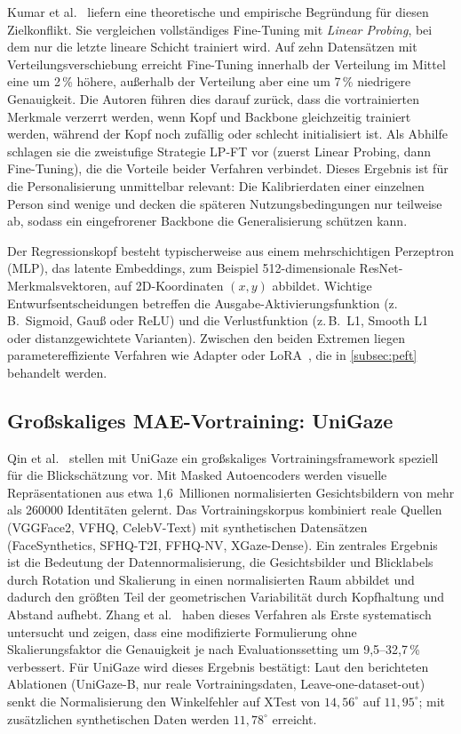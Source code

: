 \documentclass[
  11pt,
  a4paper,
  oneside,
  DIV=12,                 %
  BCOR=8mm,               %
  parskip=half,           %
  headings=normal,
  bibliography=totoc,     %
  listof=totoc            %
]{scrreprt}
\begin{document}
Kumar et al.~\cite{kumar2022finetuning} liefern eine theoretische und empirische Begründung für diesen Zielkonflikt. Sie vergleichen vollständiges Fine-Tuning mit \emph{Linear Probing}, bei dem nur die letzte lineare Schicht trainiert wird. Auf zehn Datensätzen mit Verteilungsverschiebung erreicht Fine-Tuning innerhalb der Verteilung im Mittel eine um 2\,\% höhere, außerhalb der Verteilung aber eine um 7\,\% niedrigere Genauigkeit. Die Autoren führen dies darauf zurück, dass die vortrainierten Merkmale verzerrt werden, wenn Kopf und Backbone gleichzeitig trainiert werden, während der Kopf noch zufällig oder schlecht initialisiert ist. Als Abhilfe schlagen sie die zweistufige Strategie LP-FT vor (zuerst Linear Probing, dann Fine-Tuning), die die Vorteile beider Verfahren verbindet. Dieses Ergebnis ist für die Personalisierung unmittelbar relevant: Die Kalibrierdaten einer einzelnen Person sind wenige und decken die späteren Nutzungsbedingungen nur teilweise ab, sodass ein eingefrorener Backbone die Generalisierung schützen kann.

Der Regressionskopf besteht typischerweise aus einem mehrschichtigen Perzeptron (MLP), das latente Embeddings, zum Beispiel 512-dimensionale ResNet-Merkmalsvektoren, auf 2D-Koordinaten $(x, y)$ abbildet. Wichtige Entwurfsentscheidungen betreffen die Ausgabe-Aktivierungsfunktion (z.\,B.\ Sigmoid, Gauß oder ReLU) und die Verlustfunktion (z.\,B.\ L1, Smooth L1 oder distanzgewichtete Varianten). Zwischen den beiden Extremen liegen parametereffiziente Verfahren wie Adapter oder LoRA~\cite{hu2022lora}, die in \cref{subsec:peft} behandelt werden.

\subsection{Großskaliges MAE-Vortraining: UniGaze}
\label{subsec:unigaze}
Qin et al.~\cite{qin2026unigaze} stellen mit UniGaze ein großskaliges Vortrainingsframework speziell für die Blickschätzung vor. Mit Masked Autoencoders werden visuelle Repräsentationen aus etwa 1,6~Millionen normalisierten Gesichtsbildern von mehr als \num{260000} Identitäten gelernt. Das Vortrainingskorpus kombiniert reale Quellen (VGGFace2, VFHQ, CelebV-Text) mit synthetischen Datensätzen (FaceSynthetics, SFHQ-T2I, FFHQ-NV, XGaze-Dense). Ein zentrales Ergebnis ist die Bedeutung der Datennormalisierung, die Gesichtsbilder und Blicklabels durch Rotation und Skalierung in einen normalisierten Raum abbildet und dadurch den größten Teil der geometrischen Variabilität durch Kopfhaltung und Abstand aufhebt. Zhang et al.~\cite{zhang2018normalization} haben dieses Verfahren als Erste systematisch untersucht und zeigen, dass eine modifizierte Formulierung ohne Skalierungsfaktor die Genauigkeit je nach Evaluationssetting um 9,5--32,7\,\% verbessert. Für UniGaze wird dieses Ergebnis bestätigt: Laut den berichteten Ablationen (UniGaze-B, nur reale Vortrainingsdaten, Leave-one-dataset-out) senkt die Normalisierung den Winkelfehler auf XTest von $14,56^\circ$ auf $11,95^\circ$; mit zusätzlichen synthetischen Daten werden $11,78^\circ$ erreicht.
\end{document}
